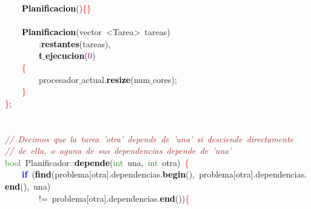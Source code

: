 \mbox{}\ \ \ \ \textbf{\textcolor{Black}{Planificacion}}\textcolor{BrickRed}{()}\textcolor{Red}{\{\}} \\
\mbox{} \\
\mbox{}\ \ \ \ \textbf{\textcolor{Black}{Planificacion}}\textcolor{BrickRed}{(}vector\ \textcolor{BrickRed}{\textless{}}Tarea\textcolor{BrickRed}{\textgreater{}}\ tareas\textcolor{BrickRed}{)} \\
\mbox{}\ \ \ \ \ \ \ \ \textcolor{BrickRed}{:}\textbf{\textcolor{Black}{restantes}}\textcolor{BrickRed}{(}tareas\textcolor{BrickRed}{),} \\
\mbox{}\ \ \ \ \ \ \ \ \textbf{\textcolor{Black}{t$\_$ejecucion}}\textcolor{BrickRed}{(}\textcolor{Purple}{0}\textcolor{BrickRed}{)} \\
\mbox{}\ \ \ \ \textcolor{Red}{\{} \\
\mbox{}\ \ \ \ \ \ \ \ procesador$\_$actual\textcolor{BrickRed}{.}\textbf{\textcolor{Black}{resize}}\textcolor{BrickRed}{(}num$\_$cores\textcolor{BrickRed}{);} \\
\mbox{}\ \ \ \ \textcolor{Red}{\}} \\
\mbox{}\textcolor{Red}{\}}\textcolor{BrickRed}{;} \\
\mbox{} \\
\mbox{} \\
\mbox{}\textit{\textcolor{Brown}{//\ Decimos\ que\ la\ tarea\ 'otra'\ depende\ de\ 'una'\ si\ desciende\ directamente}} \\
\mbox{}\textit{\textcolor{Brown}{//\ de\ ella,\ o\ aguna\ de\ sus\ dependencias\ depende\ de\ 'una'}} \\
\mbox{}\textcolor{ForestGreen}{bool}\ Planificador\textcolor{BrickRed}{::}\textbf{\textcolor{Black}{depende}}\textcolor{BrickRed}{(}\textcolor{ForestGreen}{int}\ una\textcolor{BrickRed}{,}\ \textcolor{ForestGreen}{int}\ otra\textcolor{BrickRed}{)}\ \textcolor{Red}{\{} \\
\mbox{}\ \ \ \ \textbf{\textcolor{Blue}{if}}\ \textcolor{BrickRed}{(}\textbf{\textcolor{Black}{find}}\textcolor{BrickRed}{(}problema\textcolor{BrickRed}{[}otra\textcolor{BrickRed}{].}dependencias\textcolor{BrickRed}{.}\textbf{\textcolor{Black}{begin}}\textcolor{BrickRed}{(),}\ problema\textcolor{BrickRed}{[}otra\textcolor{BrickRed}{].}dependencias\textcolor{BrickRed}{.}\textbf{\textcolor{Black}{end}}\textcolor{BrickRed}{(),}\ una\textcolor{BrickRed}{)} \\
\mbox{}\ \ \ \ \ \ \ \ \textcolor{BrickRed}{!=}\ problema\textcolor{BrickRed}{[}otra\textcolor{BrickRed}{].}dependencias\textcolor{BrickRed}{.}\textbf{\textcolor{Black}{end}}\textcolor{BrickRed}{())}\textcolor{Red}{\{} \\
